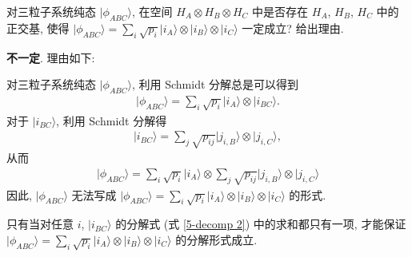 \documentclass{assignment}
\begin{document}
\begin{prob}
    对三粒子系统纯态 $\lvert\phi_{ABC}\rangle$, 在空间 $H_A\otimes H_B\otimes H_C$ 中是否存在 $H_A$, $H_B$, $H_C$ 中的正交基, 使得 $\lvert\phi_{ABC}\rangle=\sum_i\sqrt{p_i}\lvert i_A\rangle\otimes\lvert i_B\rangle\otimes\lvert i_C\rangle$ 一定成立? 给出理由.
\end{prob}
\begin{sol}
    \textbf{不一定}. 理由如下:

    对三粒子系统纯态 $\lvert\phi_{ABC}\rangle$, 利用 Schmidt 分解总是可以得到
    \begin{align}
        \label{5-decomp 1}
        \lvert\phi_{ABC}\rangle=\sum_i\sqrt{p_i}\lvert i_A\rangle\otimes\lvert i_{BC}\rangle.
    \end{align}
    对于 $\lvert i_{BC}\rangle$, 利用 Schmidt 分解得
    \begin{align}
        \label{5-decomp 2}
        \lvert i_{BC}\rangle=\sum_j\sqrt{p_{ij}}\lvert j_{i,B}\rangle\otimes\lvert j_{i,C}\rangle,
    \end{align}
    从而
    \begin{align}
        \label{5-decomp 3}
        \lvert\phi_{ABC}\rangle=\sum_i\sqrt{p_i}\lvert i_A\rangle\otimes\sum_j\sqrt{p_{ij}}\lvert j_{i,B}\rangle\otimes\lvert j_{i,C}\rangle
    \end{align}
    因此, $\lvert\phi_{ABC}\rangle$ 无法写成 $\lvert\phi_{ABC}\rangle=\sum_i\sqrt{p_i}\lvert i_A\rangle\otimes\lvert i_B\rangle\otimes\lvert i_C\rangle$ 的形式.

    只有当对任意 $i$, $\lvert i_{BC}\rangle$ 的分解式 (式 \ref{5-decomp 2}) 中的求和都只有一项, 才能保证 $\lvert\phi_{ABC}\rangle=\sum_i\sqrt{p_i}\lvert i_A\rangle\otimes\lvert i_B\rangle\otimes\lvert i_C\rangle$ 的分解形式成立.
\end{sol}
\end{document}
